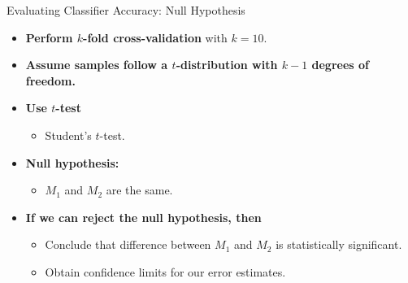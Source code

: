 \begin{frame}{Evaluating Classifier Accuracy: Null Hypothesis}
	\begin{itemize}
		\item \textbf{Perform $k$-fold cross-validation} with $k=10$.
		\item \textbf{Assume samples follow a $t$-distribution with $k-1$ degrees of freedom.}
		\item \textbf{Use $t$-test}
		      \begin{itemize}
			      \item Student's $t$-test.
		      \end{itemize}
		\item \textbf{Null hypothesis:}
		      \begin{itemize}
			      \item $M_1$ and $M_2$ are the same.
		      \end{itemize}
		\item \textbf{If we can reject the null hypothesis, then}
		      \begin{itemize}
			      \item Conclude that difference between $M_1$ and $M_2$ is statistically significant.
			      \item Obtain confidence limits for our error estimates.
		      \end{itemize}
	\end{itemize}
\end{frame}

